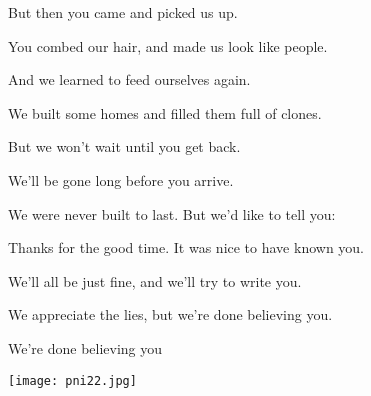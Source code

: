 \begin{chorus*}
  But then you came and picked us up.

  You combed our hair, and made us look like people.

  And we learned to feed ourselves again.

  We built some homes and filled them full of clones.

  But we won't wait until you get back. 
  
  We'll be gone long before you arrive.\pause{}\Pause{}

  We were never built to last. But we'd like to tell you:

  Thanks for the good time. It was nice to have known you.

  We'll all be just fine, and we'll try to write you.

  We appreciate the lies, but we're done believing you.\pause{}\Pause{}
\end{chorus*}

\begin{strophe*}
  We're done believing you\pause{}\Pause{}
\end{strophe*}

\vfill
\begin{center}
 \texttt{[image: pni22.jpg]}
\end{center}
\vfill